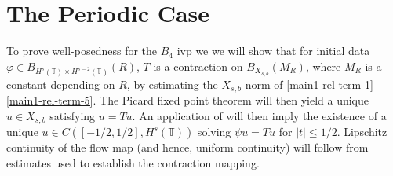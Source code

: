 \documentclass[12pt,reqno]{amsart}
\numberwithin{equation}{section}  %
\renewcommand{\cref}{\Cref}
\newcommand{\ci}{\mathbb{T}}
\newcommand{\vp}{\varphi}
\begin{document}
\section{The Periodic Case} 
\label{sec:periodic}
%
%
To prove well-posedness for the $B_4$ ivp we we will 
show that for initial data $\vp \in B_{H^{s}(\ci) \times H^{s-2}(\ci)}(R)$, $T$ is a contraction on
$B_{X_{s,b}}(M_{R})$, where $M_{R}$ is a constant depending on $R$, 
by estimating the $X_{s,b}$
norm of \eqref{main1-rel-term-1}-\eqref{main1-rel-term-5}. The 
Picard fixed point theorem will
then yield a unique $u \in X_{s,b}$ satisfying $u = Tu$.
An application of
\cref{lem:embedding} will then imply the existence of a unique
$u \in C([-1/2, 1/2], H^s(\ci))$ solving $\psi u = Tu$ for $| t | \le 1/2$.
Lipschitz continuity of the flow map (and hence, uniform
continuity) will follow from estimates used to establish the contraction
mapping. 
%
%
%
%
%
%
%
%
%
\end{document}
